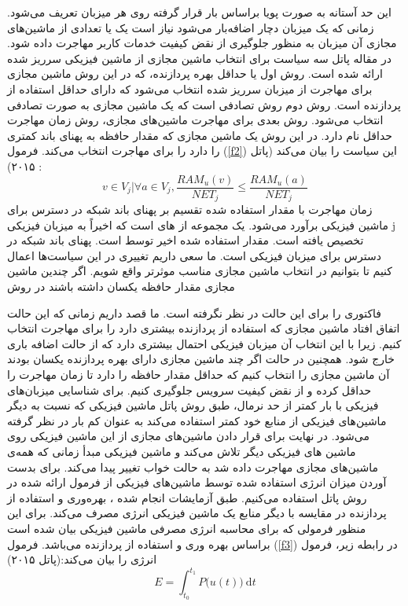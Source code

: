 این حد آستانه به صورت پویا براساس بار قرار گرفته روی هر میزبان تعریف می‌شود. زمانی که یک میزبان دچار اضافه‌بار می‌شود نیاز است یک یا تعدادی از ماشین‌های مجازی آن میزبان به منظور جلوگیری از نقض کیفیت خدمات کاربر مهاجرت داده شود. در مقاله پاتل
سه سیاست برای انتخاب ماشین مجازی از ماشین فیزیکی سرریز شده ارائه شده است. روش اول  
یا حداقل بهره پردازنده، که در این روش ماشین مجازی برای مهاجرت از میزبان سرریز شده انتخاب می‌شود که دارای حداقل استفاده از پردازنده است. روش دوم روش تصادفی است که یک ماشین مجازی به صورت تصادفی انتخاب می‌شود. روش بعدی برای مهاجرت ماشین‌های مجازی، روش زمان مهاجرت حداقل
نام دارد. در این روش یک ماشین مجازی که مقدار حافظه به پهنای باند کمتری را دارد را برای مهاجرت انتخاب می‌کند. فرمول
(\ref{f2})
 این سیاست را بیان می‌کند (پاتل ۲۰۱۵) :
\begin{equation}
v\in V_j|\forall a \in V_j, \frac{RAM_u(v)}{NET_j} \leq \frac{RAM_u(a)}{NET_j}
\label{f2}
\end{equation}
زمان مهاجرت با مقدار
استفاده شده
تقسیم بر پهنای باند شبکه در دسترس برای ماشین فیزیکی
  برآورد می‌شود. یک مجموعه از
 ‌های است که اخیراً به میزبان فیزیکی j  تخصیص یافته است.  مقدار 
  استفاده شده اخیر توسط
   است.  پهنای باند شبکه در دسترس برای میزبان فیزیکی 
    است.
ما سعی داریم تغییری در این سیاست‌ها اعمال کنیم تا بتوانیم در انتخاب ماشین مجازی مناسب موثرتر واقع شویم. اگر چندین ماشین مجازی مقدار حافظه یکسان داشته باشند در روش 

 فاکتوری را برای این حالت در نظر نگرفته است. ما قصد داریم زمانی که این حالت اتفاق افتاد ماشین مجازی که استفاده از پردازنده بیشتری دارد را برای مهاجرت انتخاب کنیم. زیرا با این انتخاب آن میزبان فیزیکی احتمال بیشتری دارد که از حالت اضافه باری خارج شود. همچنین در حالت
 اگر چند ماشین مجازی دارای بهره پردازنده یکسان بودند آن ماشین مجازی را انتخاب کنیم که حداقل مقدار حافظه را دارد تا زمان مهاجرت را حداقل کرده و از نقض کیفیت سرویس جلوگیری کنیم.
برای شناسایی میزبان‌های فیزیکی با بار کمتر از حد نرمال، طبق روش پاتل
ماشین فیزیکی که نسبت به دیگر ماشین‌های فیزیکی از منابع خود کمتر استفاده می‌کند به عنوان کم بار در نظر گرفته می‌شود. در نهایت برای قرار دادن ماشین‌های مجازی از این ماشین فیزیکی روی ماشین ‌های فیزیکی دیگر تلاش می‌کند و ماشین فیزیکی مبدأ زمانی که همه‌ی ماشین‌های مجازی مهاجرت داده شد به حالت خواب تغییر پیدا می‌کند.
برای بدست آوردن میزان انرژی استفاده شده توسط ماشین‌های فیزیکی از  فرمول ارائه شده در روش پاتل  
استفاده می‌کنیم­. طبق آزمایشات انجام شده ، بهره‌وری و استفاده از پردازنده در مقایسه با دیگر منابع یک ماشین فیزیکی انرژی مصرف می‌کند. برای این منظور فرمولی که برای محاسبه انرژی مصرفی ماشین فیزیکی بیان شده است براساس بهره وری و استفاده از پردازنده می‌باشد. فرمول
(\ref{f3})
 در رابطه زیر، فرمول انرژی را بیان می‌کند­:(پاتل ۲۰۱۵)
\begin{equation}
E=\int_{t_0}^{t_1}P\Big(u(t)\Big)\:\mathrm{d}t
\label{f3}
\end{equation}
 
